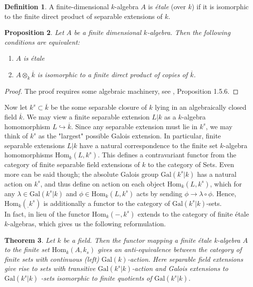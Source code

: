 \documentclass{article}
\newtheorem{theorem}{Theorem}[section]
\theoremstyle{definition}
\newtheorem{definition}[theorem]{Definition}
\theoremstyle{remark}
\theoremstyle{plain}
\newtheorem{proposition}[theorem]{Proposition}
\begin{document}
\begin{definition} 
	A finite-dimensional $k$-algebra $A$ is \textit{\'etale} (over $k$) if it is isomorphic to the finite direct product of separable extensions of $k$.
\end{definition}

\begin{proposition} 
	Let $A$ be a finite dimensional $k$-algebra.
	Then the following conditions are equivalent:
	\begin{enumerate}
		\item $A$ is \'etale
		\item $A \otimes_k \overline{k}$ is isomorphic to a finite direct product of copies of $\overline{k}$.
	\end{enumerate}
\end{proposition}
\begin{proof}
	The proof requires some algebraic machinery, see \cite{Szamuely}, Proposition 1.5.6.
\end{proof}

Now let $k^s \subset \overline{k}$ be the some separable closure of $k$ lying in an algebraically closed field $\overline{k}$.
We may view a finite separable extension $L|k$ as a $k$-algebra homomorphism $L \hookrightarrow \overline{k}$. Since any separable extension must lie in $k^s$, we may think of $k^s$ as the "largest" possible Galois extension.
In particular, finite separable extensions $L|k$ have a natural correspondence to the finite set $k$-algebra homomorphisms $\text{Hom}_k(L, k^s)$.
 This defines a contravariant functor from the category of finite separable field extensions of $k$ to the category of Sets.
 Even more can be said though; the absolute Galois group $\text{Gal}(k^s|k)$ has a natural action on $k^s$, and thus define on action on each object $\text{Hom}_k(L, k^s)$, which for any $\lambda \in \text{Gal}(k^s|k)$ and $\phi \in \text{Hom}_k(L, k^s)$ acts by sending $\phi \to \lambda \circ \phi$.
 Hence, $\text{Hom}_k(_, k^s)$ is additionally a functor to the category of $\text{Gal}(k^s|k)$-sets.\\
\indent In fact, in lieu of  the functor $\text{Hom}_k(-,k^s)$ extends to the category of finite \'etale $k$-algebras, which gives us the following reformulation.

\begin{theorem}
	Let $k$ be a field. 
	Then the functor mapping a finite \'etale k-algebra $A$ to the finite set $\text{Hom}_k(A, k_s)$ gives an anti-equivalence between the category of finite sets with continuous (left) $\text{Gal}(k)$-action.
	Here separable field extensions give rise to sets with transitive $\text{Gal}(k^s|k)$-action and Galois extensions to $\text{Gal}(k^s|k)$ -sets isomorphic to finite quotients of $\text{Gal}(k^s|k)$.
\end{theorem}
\end{document}
